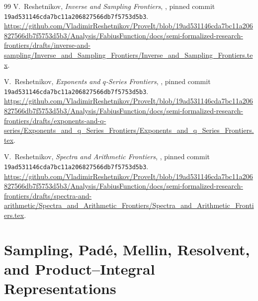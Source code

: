 \documentclass[11pt]{article}
\renewcommand{\headrulewidth}{0.3pt}
\theoremstyle{definition}
\theoremstyle{remark}
\begin{document}
\begin{thebibliography}{99}
V.~Reshetnikov,
\newblock \emph{Inverse and Sampling Frontiers},
\newblock \repo, pinned commit
\nolinkurl{19ad531146cda7bc11a206827566db7f5753d5b3}.
\newblock \url{https://github.com/VladimirReshetnikov/ProveIt/blob/19ad531146cda7bc11a206827566db7f5753d5b3/Analysis/FabiusFunction/docs/semi-formalized-research-frontiers/drafts/inverse-and-sampling/Inverse_and_Sampling_Frontiers/Inverse_and_Sampling_Frontiers.tex}.

V.~Reshetnikov,
\newblock \emph{Exponents and $q$-Series Frontiers},
\newblock \repo, pinned commit
\nolinkurl{19ad531146cda7bc11a206827566db7f5753d5b3}.
\newblock \url{https://github.com/VladimirReshetnikov/ProveIt/blob/19ad531146cda7bc11a206827566db7f5753d5b3/Analysis/FabiusFunction/docs/semi-formalized-research-frontiers/drafts/exponents-and-q-series/Exponents_and_q_Series_Frontiers/Exponents_and_q_Series_Frontiers.tex}.

V.~Reshetnikov,
\newblock \emph{Spectra and Arithmetic Frontiers},
\newblock \repo, pinned commit
\nolinkurl{19ad531146cda7bc11a206827566db7f5753d5b3}.
\newblock \url{https://github.com/VladimirReshetnikov/ProveIt/blob/19ad531146cda7bc11a206827566db7f5753d5b3/Analysis/FabiusFunction/docs/semi-formalized-research-frontiers/drafts/spectra-and-arithmetic/Spectra_and_Arithmetic_Frontiers/Spectra_and_Arithmetic_Frontiers.tex}.

\end{thebibliography}
\endgroup


\renewcommand{\headrulewidth}{0.3pt}
\newcommand{\statusknownPartl}{\textsf{K}}
\newcommand{\statusderivedPartl}{\textsf{D}}
\newcommand{\statusnewPartl}{\textsf{N}}

\setcounter{section}{0}
\renewcommand{\thesection}{\arabic{section}}
\part{Sampling, Pad\'e, Mellin, Resolvent, and Product--Integral Representations}
\end{document}
